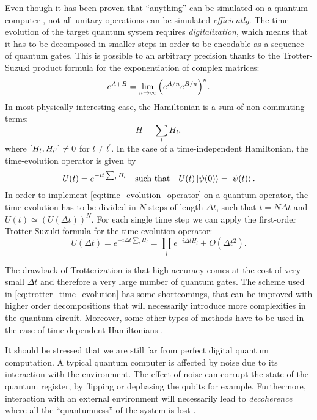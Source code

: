 Even though it has been proven that ``anything'' can be simulated on a quantum computer \cite{lloyd1996simulator}, not all unitary operations can be simulated \emph{efficiently}.
The time-evolution of the target quantum system requires \emph{digitalization}, which means that it has to be decomposed in smaller steps in order to be encodable as a sequence of quantum gates.
This is possible to an arbitrary precision thanks to the Trotter-Suzuki product formula for the exponentiation of complex matrices:
\begin{equation}
    e^{A + B}  = \lim_{n \to \infty} \qty( e^{A/n} e^{B/n} )^n.
\end{equation}
In most physically interesting case, the Hamiltonian is a sum of non-commuting terms:
\begin{equation*}
    H = \sum_{l} H_{l},
\end{equation*}
where $\comm{H_l}{H_{l^{\prime}}} \neq 0$ for $l \neq l^{\prime}$.
In the case of a time-independent Hamiltonian, the time-evolution operator is given by
\begin{equation}
    U(t) = e^{-i t \sum_{l} H_l }
    \quad \text{such that} \quad
    U(t) \ket{\psi(0)} = \ket{\psi(t)}.
    \label{eq:time_evolution_operator}
\end{equation}
In order to implement \eqref{eq:time_evolution_operator} on a quantum operator, the time-evolution has to be divided in $N$ steps of length $\Delta t$, such that $t = N \Delta t$ and $U(t) \simeq (U(\Delta t))^N$.
For each single time step we can apply the first-order Trotter-Suzuki formula \cite{nielsen2010quantum, somma2002simulating} for the time-evolution operator:
\begin{equation}
    U(\Delta t)
    = e^{- i \Delta t \sum_{l} H_l}
    = \prod_{l} e^{-i \Delta t H_l} + O(\Delta t^2).
    \label{eq:trotter_time_evolution}
\end{equation}

The drawback of Trotterization is that high accuracy comes at the cost of very small $\Delta t$ and therefore a very large number of quantum gates.
The scheme used in \eqref{eq:trotter_time_evolution} has some shortcomings, that can be improved with higher order decompositions that will necessarily introduce more complexities in the quantum circuit.
Moreover, some other types of methods have to be used in the case of time-dependent Hamiltonians \cite{wiebe2011simulation}.

\medskip

It should be stressed that we are still far from perfect digital quantum computation.
A typical quantum computer is affected by noise due to its interaction with the environment.
The effect of noise can corrupt the state of the quantum register, by flipping or dephasing the qubits for example.
Furthermore, interaction with an external environment will necessarily lead to \emph{decoherence} where all the ``quantumness'' of the system is lost \cite{zurek1991decoherence, schlosshauer2014decoherence, schlosshauer2019decoherence}.

